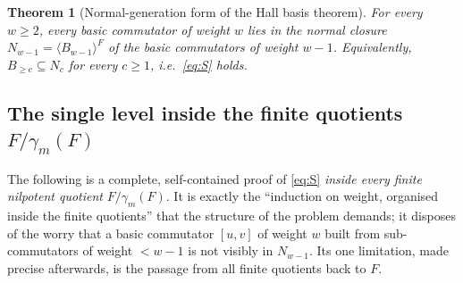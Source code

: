 \documentclass{amsart}
\newtheorem{theorem}{Theorem}
\theoremstyle{definition}
\theoremstyle{remark}
\begin{document}
\begin{theorem}[Normal-generation form of the Hall basis theorem]\label{thm:S}
For every $w\ge2$, every basic commutator of weight $w$ lies in the normal closure
$N_{w-1}=\langle B_{w-1}\rangle^{F}$ of the basic commutators of weight $w-1$.
Equivalently, $B_{\ge c}\subseteq N_c$ for every $c\ge1$, i.e.\ \eqref{eq:S} holds.
\end{theorem}

\subsection*{The single level inside the finite quotients $F/\gamma_m(F)$}

The following is a complete, self-contained proof of \eqref{eq:S} \emph{inside every
finite nilpotent quotient} $F/\gamma_m(F)$. It is exactly the ``induction on weight,
organised inside the finite quotients'' that the structure of the problem demands;
it disposes of the worry that a basic commutator $[u,v]$ of weight $w$ built from
sub-commutators of weight $<w-1$ is not visibly in $N_{w-1}$. Its one limitation,
made precise afterwards, is the passage from all finite quotients back to $F$.
\end{document}
